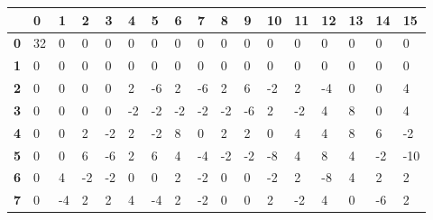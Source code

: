 \begin{longtable}[c]{|l|l|l|l|l|l|l|l|l|l|l|l|l|l|l|l|l|}
\hline
            & \textbf{0} & \textbf{1} & \textbf{2} & \textbf{3} & \textbf{4} & \textbf{5} & \textbf{6} & \textbf{7} & \textbf{8} & \textbf{9} & \textbf{10} & \textbf{11} & \textbf{12} & \textbf{13} & \textbf{14} & \textbf{15} \\ \hline
\endfirsthead
%
\endhead
%
\textbf{0}  & 32         & 0          & 0          & 0          & 0          & 0          & 0          & 0          & 0          & 0          & 0           & 0           & 0           & 0           & 0           & 0           \\ \hline
\textbf{1}  & 0          & 0          & 0          & 0          & 0          & 0          & 0          & 0          & 0          & 0          & 0           & 0           & 0           & 0           & 0           & 0           \\ \hline
\textbf{2}  & 0          & 0          & 0          & 0          & 2          & -6         & 2          & -6         & 2          & 6          & -2          & 2           & -4          & 0           & 0           & 4           \\ \hline
\textbf{3}  & 0          & 0          & 0          & 0          & -2         & -2         & -2         & -2         & -2         & -6         & 2           & -2          & 4           & 8           & 0           & 4           \\ \hline
\textbf{4}  & 0          & 0          & 2          & -2         & 2          & -2         & 8          & 0          & 2          & 2          & 0           & 4           & 4           & 8           & 6           & -2          \\ \hline
\textbf{5}  & 0          & 0          & 6          & -6         & 2          & 6          & 4          & -4         & -2         & -2         & -8          & 4           & 8           & 4           & -2          & -10         \\ \hline
\textbf{6}  & 0          & 4          & -2         & -2         & 0          & 0          & 2          & -2         & 0          & 0          & -2          & 2           & -8          & 4           & 2           & 2           \\ \hline
\textbf{7}  & 0          & -4         & 2          & 2          & 4          & -4         & 2          & -2         & 0          & 0          & 2           & -2          & 4           & 0           & -6          & 2           \\ \hline

\end{longtable}
